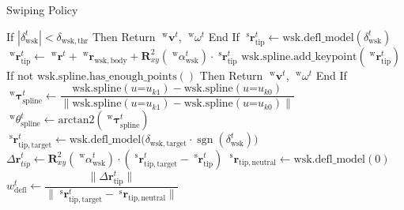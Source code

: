 \begin{algorithm}[htb]
    \caption{Swiping Policy}
    \begin{algorithmic}
        \State If \(|\delta_{\mathrm{wsk}}^{t}| < \delta_{\mathrm{wsk, thr}}\) Then 
        \State \quad Return \(\;^{\mathrm{w}}\boldsymbol{v}^{t}\), \(\;^{\mathrm{w}}\omega^{t}\)
        \State End If
        \State
        \State \(\;^{\mathrm{s}}\boldsymbol{r}_{\mathrm{tip}}^{t} \gets \mathrm{wsk.defl\_model}(\delta_{\mathrm{wsk}}^{t})\)
        \State \(\;^{\mathrm{w}}\boldsymbol{r}_{\mathrm{tip}}^{t} \gets \;^{\mathrm{w}}\boldsymbol{r}^{t} + \;^{\mathrm{w}}\boldsymbol{r}_{\mathrm{wsk, body}} + \boldsymbol{R}_{xy}^{2}(\; ^{\mathrm{w}}\alpha_{\mathrm{wsk}}^{t}) \cdot \;^{\mathrm{s}}\boldsymbol{r}_{\mathrm{tip}}^{t}\)
        \State \(\mathrm{wsk.spline.add\_keypoint}(\;^{\mathrm{w}}\boldsymbol{r}_{\mathrm{tip}}^{t})\)
        \State If not \(\mathrm{wsk.spline.has\_enough\_points()}\) Then 
        \State \quad Return \(\;^{\mathrm{w}}\boldsymbol{v}^{t}\), \(\;^{\mathrm{w}}\omega^{t}\)
        \State End If
        \State
        \State \(\;^{\mathrm{w}}\boldsymbol{\tau}_{\mathrm{spline}}^{t} \gets \dfrac{\mathrm{wsk.spline}(u\mathord{=}u_{k1}) - \mathrm{wsk.spline}(u\mathord{=}u_{k0})}{\|\mathrm{wsk.spline}(u\mathord{=}u_{k1}) - \mathrm{wsk.spline}(u\mathord{=}u_{k0})\|}\) 
        \State \(\;^{\mathrm{w}}\theta_{\mathrm{spline}}^{t} \gets \mathrm{arctan2}(\;^{\mathrm{w}}\boldsymbol{\tau}_{\mathrm{spline}}^{t})\) 
        \State \(\;^{\mathrm{s}}\boldsymbol{r}_{\mathrm{tip, target}}^{t} \gets \mathrm{wsk.defl\_model}\big(\delta_{\mathrm{wsk, target}} \cdot \operatorname{sgn}(\delta_{\mathrm{wsk}}^{t})\big)\) 
        \State \(\Delta\boldsymbol{r}_{tip}^{t} \gets \boldsymbol{R}_{xy}^{2}(\; ^{\mathrm{w}}\alpha_{\mathrm{wsk}}^{t}) \cdot (\;^{\mathrm{s}}\boldsymbol{r}_{\mathrm{tip, target}}^{t} - \;^{\mathrm{s}}\boldsymbol{r}_{\mathrm{tip}}^{t})\) 
        \State \(\;^{\mathrm{s}}\boldsymbol{r}_{\mathrm{tip, neutral}} \gets \mathrm{wsk.defl\_model}(0)\) 
        \State \(w_{\mathrm{defl}}^{t} \gets \dfrac{\|\Delta\boldsymbol{r}_{\mathrm{tip}}^{t}\|}{\|\;^{\mathrm{s}}\boldsymbol{r}_{\mathrm{tip, target}}^{t} - \;^{\mathrm{s}}\boldsymbol{r}_{\mathrm{tip, neutral}}\|}\) 

\end{algorithmic}
\end{algorithm}
